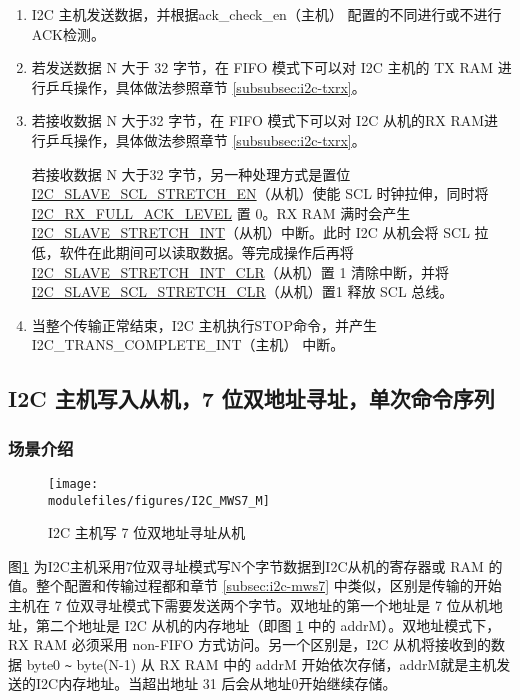 \documentclass[main\_\_CN.tex]{subfiles}
\begin{document}
\begin{enumerate}
\item I2C 主机发送数据，并根据ack\_check\_en（主机） 配置的不同进行或不进行ACK检测。

\item 若发送数据 N 大于 32 字节，在 FIFO 模式下可以对 I2C 主机的 TX RAM 进行乒乓操作，具体做法参照章节 \ref{subsubsec:i2c-txrx}。
\item 若接收数据 N 大于32 字节，在 FIFO 模式下可以对 I2C 从机的RX RAM进行乒乓操作，具体做法参照章节 \ref{subsubsec:i2c-txrx}。

若接收数据 N 大于32 字节，另一种处理方式是置位 \hyperref[fielddesc:I2CSLAVESCLSTRETCHEN]{I2C\_SLAVE\_SCL\_STRETCH\_EN}（从机）使能 SCL 时钟拉伸，同时将 \hyperref[fielddesc:I2CRXFULLACKLEVEL]{I2C\_RX\_FULL\_ACK\_LEVEL} 置 0。RX RAM 满时会产生 \hyperref[int:i2c-slave-stretch]{I2C\_SLAVE\_STRETCH\_INT}（从机）中断。此时 I2C 从机会将 SCL 拉低，软件在此期间可以读取数据。等完成操作后再将 \hyperref[fielddesc:I2CSLAVESTRETCHINTCLR]{I2C\_SLAVE\_STRETCH\_INT\_CLR}（从机）置 1 清除中断，并将\hyperref[fielddesc:I2CSLAVESCLSTRETCHCLR]{I2C\_SLAVE\_SCL\_STRETCH\_CLR}（从机）置1 释放 SCL 总线。

\item 当整个传输正常结束，I2C 主机执行STOP命令，并产生 I2C\_TRANS\_COMPLETE\_INT（主机） 中断。

\end{enumerate}



\subsection{I2C 主机写入从机，7 位双地址寻址，单次命令序列}
\subsubsection{场景介绍}
\begin{figure}[H]
    \centering
    \texttt{[image: \\modulefiles/figures/I2C\_MWS7\_M]}
    \caption{I2C 主机写 7 位双地址寻址从机}
    \label{fig:i2c-mws7-double}
\end{figure}

图\ref{fig:i2c-mws7-double} 为I2C主机采用7位双寻址模式写N个字节数据到I2C从机的寄存器或 RAM 的值。整个配置和传输过程都和章节 \ref{subsec:i2c-mws7} 中类似，区别是传输的开始主机在 7 位双寻址模式下需要发送两个字节。双地址的第一个地址是 7 位从机地址，第二个地址是 I2C 从机的内存地址（即图 \ref{fig:i2c-mws7-double} 中的 addrM）。双地址模式下，RX RAM 必须采用 non-FIFO 方式访问。另一个区别是，I2C 从机将接收到的数据 byte0 \verb+~+ byte(N-1) 从 RX RAM 中的 addrM 开始依次存储，addrM就是主机发送的I2C内存地址。当超出地址 31 后会从地址0开始继续存储。
\end{document}

